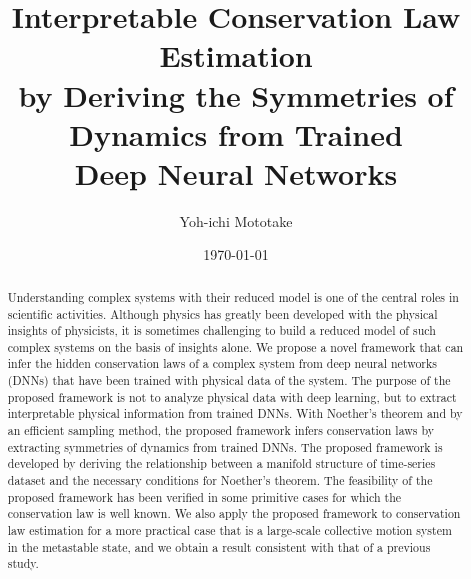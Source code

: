 \documentclass[preprint,
bibnotes,
 amsmath,amssymb,
 aps,
]{revtex4-1}
\begin{document}

\title{Interpretable Conservation Law Estimation\\ by Deriving the Symmetries of Dynamics from Trained\\ Deep Neural Networks}

\author{Yoh-ichi Mototake}







\date{\today}

\begin{abstract}
Understanding complex systems with their reduced model is one of the central roles in scientific activities.  Although physics has greatly been developed with the physical insights of physicists, it is sometimes challenging to build a reduced model of such complex systems on the basis of insights alone. We propose a novel framework that can infer the hidden conservation laws of a complex system from deep neural networks (DNNs) that have been trained with physical data of the system. The purpose of the proposed framework is not to analyze physical data with deep learning, but to extract interpretable physical information from trained DNNs. With Noether's theorem and by an efficient sampling method, the proposed framework infers conservation laws by extracting symmetries of dynamics from trained DNNs. The proposed framework is developed by deriving the relationship between a manifold structure of time-series dataset and the necessary conditions for Noether's theorem. 
The feasibility of the proposed framework has been verified in some primitive cases for which the conservation law is well known. 
We also apply the proposed framework to conservation law estimation for a more practical case that is a large-scale collective motion system in the metastable state, and we obtain a result consistent with that of a previous study. 
\end{abstract}


\maketitle
\end{document}
